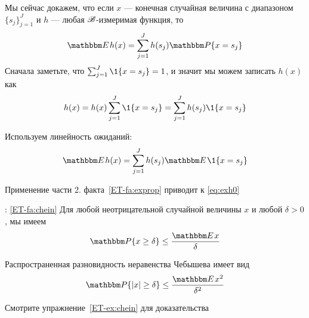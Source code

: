 \begin{frame}

    \vspace{2em}
    Мы сейчас докажем, что если $x$ --- конечная
    случайная величина с диапазоном $\{s_j\}_{j=1}^J$ и $h$ --- 
    любая $\mathscr B$-измеримая функция, то
    \begin{equation}
        \label{eq:exh0}
        \EE h(x) = \sum_{j=1}^J h(s_j) \PP\{x = s_j\}
    \end{equation}
    Сначала заметьте, что $\sum_{j=1}^J \1\{x = s_j\} = 1$, и значит мы можем
    записать $h(x)$ как 
    \begin{equation*}
        h(x) 
        = h(x) \sum_{j=1}^J \1\{x = s_j\}  
        = \sum_{j=1}^J h(s_j) \1\{x = s_j\}
    \end{equation*}
    
\end{frame}

\begin{frame}
    
    \vspace{2em}
    Используем линейность ожиданий:
        $$\EE h(x) =  \sum_{j=1}^J h(s_j) \EE \1\{x = s_j\}$$
    
    Применение части 2. факта~\ref{ET-fa:exprop} приводит к \eqref{eq:exh0}
    
\end{frame}

\begin{frame}
    
    \vspace{2em}
    
    :
    \Fact\eqref{ET-fa:chein}
        Для любой неотрицательной случайной величины $x$ и любой $\delta > 0$, мы имеем
        \begin{equation}
            \label{eq:chein0}
            \PP\{x \geq \delta \} \leq \frac{\EE x}{\delta}
        \end{equation}
    
    Распространенная разновидность неравенства Чебышева имеет вид
    \begin{equation}
        \label{eq:chein}
        \PP\{|x| \geq \delta \} \leq \frac{\EE x^2}{\delta^2}
    \end{equation}
    
    
    Смотрите упражнение~\ref{ET-ex:chein} для доказательства
    
\end{frame}

